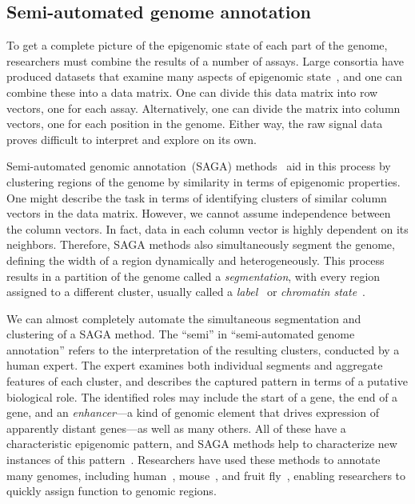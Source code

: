 \documentclass[5p]{elsarticle}
\newcommand{\rev}[1]{{\color{black}#1}}
\begin{document}
\subsection{Semi-automated genome annotation}

To get a complete picture of the epigenomic state of each part of the genome, researchers must combine the results of a number of assays.
Large consortia have produced datasets that examine many aspects of epigenomic state~\rev{\cite{Kundaje2015IntegrativeEpigenomes,ENCODEProjectConsortium2004TheProject,Bujold2016ThePortal}}, and one can combine these into a data matrix.
One can divide this data matrix into row vectors, one for each \rev{assay.} 
Alternatively, one can divide the matrix into column vectors, one for each position in the genome.
Either way, the raw signal data proves difficult to interpret and explore on its own.

Semi-automated genomic annotation~(SAGA) methods~\cite{Libbrecht2015JointExpression} aid in this process by clustering regions of the genome by similarity in terms of epigenomic properties.
One might describe the task in terms of identifying clusters of similar column vectors in the data matrix.
However, we cannot assume independence between the column vectors.
In fact, data in each column vector is highly dependent on its neighbors.
Therefore, SAGA methods also simultaneously segment the genome, defining the width of a region dynamically and heterogeneously.
This process results in a partition of the genome called a \emph{segmentation}, with every region assigned to a different cluster, usually called a \emph{label}~\cite{Hoffman2012UnsupervisedSegmentation} or \emph{chromatin state}~\cite{Ernst2012ChromHMM:Characterization}.

We can almost completely automate the simultaneous segmentation and clustering \rev{of} a SAGA method.
The \rev{``semi''} in ``semi-automated genome annotation'' refers to the interpretation of the resulting clusters, conducted by a human expert.
The expert examines both individual segments and aggregate features of each cluster, and describes the captured pattern in terms of a putative biological role.
The identified roles may include the start of a gene, the end of a gene, and an \emph{enhancer}---a kind of genomic element that drives expression of apparently distant genes---as well as many others.
All of these have a characteristic epigenomic pattern, and SAGA methods help to characterize new instances of this pattern~\cite{Hoffman2013IntegrativeData}.
Researchers have used these methods to annotate many genomes, including human~\rev{\cite{Hoffman2012UnsupervisedSegmentation, Ernst2012ChromHMM:Characterization,Day2007UnsupervisedData,Zhang2016JointlyTypes}}, mouse~\cite{Yue2014AGenome}, and fruit fly~\cite{Kharchenko2011ComprehensiveMelanogaster}, enabling researchers to quickly assign function to genomic regions.
\end{document}
